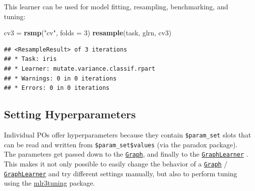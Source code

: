 \documentclass[]{scrbook}
\newenvironment{Shaded}{\begin{snugshade}}{\end{snugshade}}
\newcommand{\DataTypeTok}[1]{\textcolor[rgb]{0.13,0.29,0.53}{#1}}
\newcommand{\DecValTok}[1]{\textcolor[rgb]{0.00,0.00,0.81}{#1}}
\newcommand{\FloatTok}[1]{\textcolor[rgb]{0.00,0.00,0.81}{#1}}
\newcommand{\KeywordTok}[1]{\textcolor[rgb]{0.13,0.29,0.53}{\textbf{#1}}}
\newcommand{\NormalTok}[1]{#1}
\newcommand{\OperatorTok}[1]{\textcolor[rgb]{0.81,0.36,0.00}{\textbf{#1}}}
\newcommand{\StringTok}[1]{\textcolor[rgb]{0.31,0.60,0.02}{#1}}
\renewenvironment{Shaded} {\begin{snugshade}\small} {\end{snugshade}}
\begin{document}
\begin{Shaded}
\end{Shaded}

This learner can be used for model fitting, resampling, benchmarking, and tuning:

\begin{Shaded}
\begin{Highlighting}[]
\NormalTok{cv3 =}\StringTok{ }\KeywordTok{rsmp}\NormalTok{(}\StringTok{"cv"}\NormalTok{, }\DataTypeTok{folds =} \DecValTok{3}\NormalTok{)}
\KeywordTok{resample}\NormalTok{(task, glrn, cv3)}
\end{Highlighting}
\end{Shaded}

\begin{verbatim}
## <ResampleResult> of 3 iterations
## * Task: iris
## * Learner: mutate.variance.classif.rpart
## * Warnings: 0 in 0 iterations
## * Errors: 0 in 0 iterations
\end{verbatim}

\hypertarget{pipe-hyperpars}{%
\subsection{Setting Hyperparameters}\label{pipe-hyperpars}}

Individual POs offer hyperparameters because they contain \texttt{\$param\_set} slots that can be read and written from \texttt{\$param\_set\$values} (via the paradox package).
The parameters get passed down to the \href{https://mlr3pipelines.mlr-org.com/reference/Graph.html}{\texttt{Graph}}, and finally to the \href{https://mlr3pipelines.mlr-org.com/reference/mlr_learners_graph.html}{\texttt{GraphLearner}} .
This makes it not only possible to easily change the behavior of a \href{https://mlr3pipelines.mlr-org.com/reference/Graph.html}{\texttt{Graph}} / \href{https://mlr3pipelines.mlr-org.com/reference/mlr_learners_graph.html}{\texttt{GraphLearner}} and try different settings manually, but also to perform tuning using the \href{https://mlr3tuning.mlr-org.com}{mlr3tuning} package.

\begin{Shaded}
\end{Shaded}
\end{document}
